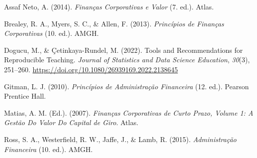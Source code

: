 \documentclass[
  a4paper,
]{book}
\newlength{\cslhangindent}
\newenvironment{CSLReferences}[2] %
 {\begin{list}{}{%
  \setlength{\itemindent}{0pt}
  \setlength{\leftmargin}{0pt}
  \setlength{\parsep}{0pt}
  \ifodd #1
   \setlength{\leftmargin}{\cslhangindent}
   \setlength{\itemindent}{-1\cslhangindent}
  \fi
  \setlength{\itemsep}{#2\baselineskip}}}
 {\end{list}}
\begin{document}
\label{refs}
\begin{CSLReferences}{1}{0}
Assaf Neto, A. (2014). \emph{Finan{ç}as Corporativas e Valor} (7. ed.).
Atlas.

Brealey, R. A., Myers, S. C., \& Allen, F. (2013). \emph{Princ{í}pios de
Finan{ç}as Corporativas} (10. ed.). AMGH.

Dogucu, M., \& Çetinkaya-Rundel, M. (2022). Tools and Recommendations
for Reproducible Teaching. \emph{Journal of Statistics and Data Science
Education}, \emph{30}(3), 251--260.
\url{https://doi.org/10.1080/26939169.2022.2138645}

Gitman, L. J. (2010). \emph{Princ{í}pios de Administra{ç}{ã}o
Financeira} (12. ed.). Pearson Prentice Hall.

Matias, A. M. (Ed.). (2007). \emph{Finan{ç}as Corporativas de Curto
Prazo, Volume 1: A Gest{ã}o Do Valor Do Capital de Giro}. Atlas.

Ross, S. A., Westerfield, R. W., Jaffe, J., \& Lamb, R. (2015).
\emph{Administra{ç}{ã}o Financeira} (10. ed.). AMGH.

\end{CSLReferences}


\backmatter
\end{document}
